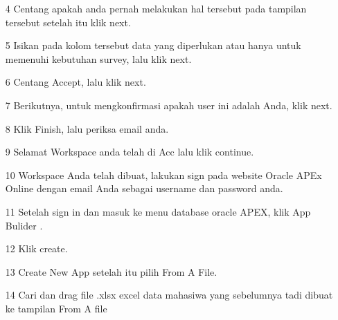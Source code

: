 \begin{enumerate}
        
\item[4]Centang apakah anda pernah melakukan hal tersebut pada tampilan tersebut setelah itu klik next.  

   
        

\item[5]Isikan pada kolom tersebut data yang diperlukan atau hanya untuk memenuhi kebutuhan survey, lalu klik next.

 



\item[6] Centang Accept, lalu klik next.

 



\item[7]Berikutnya, untuk mengkonfirmasi apakah user ini adalah Anda, klik next.





\item[8] Klik Finish, lalu periksa email anda.

  



\item[9] Selamat Workspace anda telah di Acc lalu klik continue.





\item[10] Workspace Anda telah dibuat, lakukan sign pada website Oracle APEx Online dengan email Anda sebagai username dan password anda.

  



\item[11] Setelah sign in dan masuk ke menu database oracle APEX, klik App Bulider .

 



\item[12] Klik create.





\item[13]Create New App setelah itu pilih From A File.





\item[14]Cari dan drag file .xlsx excel data mahasiwa  yang sebelumnya tadi dibuat ke tampilan From A file






\end{enumerate}
